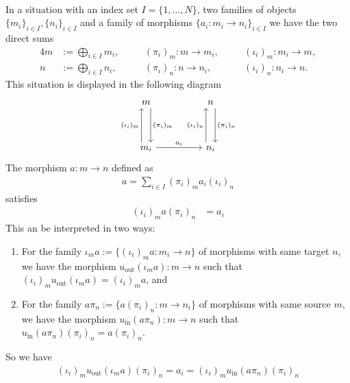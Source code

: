\begin{example}\phantom{}\label{ex:block_diagonal_matrix}\\
In a situation with an index set $I = \{1,\dots,N\}$, two families of objects $\{m_{i}\}_{i\in I}, \{n_{i}\}_{i\in I}$ and a family of
morphisms $\{a_{i} : m_{i} \rightarrow n_{i}\}_{i\in I}$ we have the two direct sums
\begin{alignat}{4}
m &:= \bigoplus_{i\in I} m_{i},\quad &&(\pi_{i})_{m} : m \rightarrow m_{i},\quad &&(\iota_{i})_{m} : m_{i} \rightarrow m, \\
n &:= \bigoplus_{i\in I} n_{i},\quad &&(\pi_{i})_{n} : n \rightarrow n_{i},\quad &&(\iota_{i})_{n} : n_{i} \rightarrow n.
\end{alignat}
This situation is displayed in the following diagram
\[
\begin{tikzcd}
m \arrow[dd, "(\pi_{i})_{m}", shift left=2]                           &  & n \arrow[dd, "(\pi_{i})_{n}", shift left=2]       \\
                                                                      &  &                                                   \\
m_{i} \arrow[uu, "(\iota_{i})_{m}", shift left=2] \arrow[rr, "a_{i}"] &  & n_{i} \arrow[uu, "(\iota_{i})_{n}", shift left=2]
\end{tikzcd}
\]
The morphism $a : m \rightarrow n$ defined as
\begin{align}
a = \sum_{i \in I} (\pi_{i})_{m} a_{i} (\iota_{i})_{n}
\end{align}
satisfies
\begin{align}
(\iota_{i})_{m} a (\pi_{i})_{n} &= a_{i}
\end{align}
This an be interpreted in two ways:
\begin{enumerate}
\renewcommand{\labelenumi}{(\theenumi)}
\item For the family $\iota_{m} a := \{ (\iota_{i})_{m} a : m_{i} \rightarrow n \}$ of morphisms with same target $n$, we have the morphism
$u_{\text{out}}(\iota_{m} a) : m \rightarrow n$ such that $(\iota_{i})_{m} u_{\text{out}}(\iota_{m} a) = (\iota_{i})_{m} a$, and
\item For the family $a \pi_{n} := \{ a (\pi_{i})_{n} : m \rightarrow n_{i} \}$ of morphisms with same source $m$, we have the morphism
$u_{\text{in}}(a \pi_{n}) : m \rightarrow n$ such that $u_{\text{in}}(a \pi_{n}) (\pi_{i})_{n} = a (\pi_{i})_{n}$.
\end{enumerate}
So we have
\begin{align}
(\iota_{i})_{m} u_{\text{out}}(\iota_{m} a) (\pi_{i})_{n} = a_{i} = (\iota_{i})_{m} u_{\text{in}}(a \pi_{n}) (\pi_{i})_{n}
\end{align}
\end{example}

